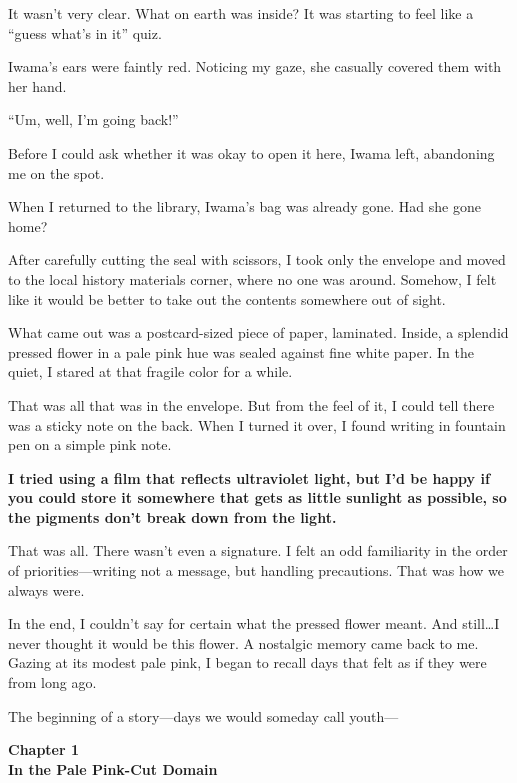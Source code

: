 \documentclass[
    a4paper,
    12pt,
    twoside,
    openany,
    UTF8,
    fontset=windows
]{ctexbook}
\begin{document}
It wasn't very clear. What on earth was inside? It was starting to feel like a ``guess what's in it'' quiz.

Iwama's ears were faintly red. Noticing my gaze, she casually covered them with her hand.

``Um, well, I'm going back!''

Before I could ask whether it was okay to open it here, Iwama left, abandoning me on the spot.

When I returned to the library, Iwama's bag was already gone. Had she gone home?

After carefully cutting the seal with scissors, I took only the envelope and moved to the local history materials corner, where no one was around. Somehow, I felt like it would be better to take out the contents somewhere out of sight.

What came out was a postcard-sized piece of paper, laminated. Inside, a splendid pressed flower in a pale pink hue was sealed against fine white paper. In the quiet, I stared at that fragile color for a while.

That was all that was in the envelope. But from the feel of it, I could tell there was a sticky note on the back. When I turned it over, I found writing in fountain pen on a simple pink note.

\textbf{I tried using a film that reflects ultraviolet light, but I'd be happy if you could store it somewhere that gets as little sunlight as possible, so the pigments don't break down from the light.}

That was all. There wasn't even a signature.
I felt an odd familiarity in the order of priorities---writing not a message, but handling precautions.
That was how we always were.

In the end, I couldn't say for certain what the pressed flower meant.
And still\dots I never thought it would be this flower. A nostalgic memory came back to me.
Gazing at its modest pale pink, I began to recall days that felt as if they were from long ago.

The beginning of a story---days we would someday call youth---


\clearpage
\thispagestyle{plain}
\begin{center}
    \large\bfseries
    Chapter 1\\
    In the Pale Pink-Cut Domain
\end{center}
\label{sec:ch1}
\vspace{1cm}
\end{document}
